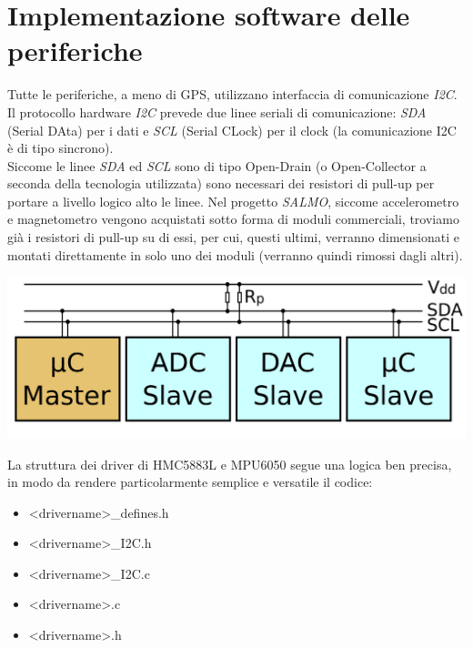 \hypertarget{implementazione-software-delle-periferiche}{%
\section{Implementazione software delle
periferiche}\label{implementazione-software-delle-periferiche}}

Tutte le periferiche, a meno di GPS, utilizzano interfaccia di
comunicazione \emph{I2C}.\\
Il protocollo hardware \emph{I2C} prevede due linee seriali di
comunicazione: \emph{SDA} (Serial DAta) per i dati e \emph{SCL} (Serial
CLock) per il clock (la comunicazione I2C è di tipo sincrono).\\
Siccome le linee \emph{SDA} ed \emph{SCL} sono di tipo Open-Drain (o
Open-Collector a seconda della tecnologia utilizzata) sono necessari dei
resistori di pull-up per portare a livello logico alto le linee. Nel
progetto \emph{SALMO}, siccome accelerometro e magnetometro vengono
acquistati sotto forma di moduli commerciali, troviamo già i resistori
di pull-up su di essi, per cui, questi ultimi, verranno dimensionati e
montati direttamente in solo uno dei moduli (verranno quindi rimossi
dagli altri).

\begin{center}
\includegraphics[scale=0.2]{figures/image61.png}
\captionsetup{type=figure}
\end{center}

\noindent La struttura dei driver di HMC5883L e MPU6050 segue una logica ben
precisa, in modo da rendere particolarmente semplice e versatile il
codice:

\begin{itemize}
\item
  
  \textless drivername\textgreater\_defines.h
  
\item
  
  \textless drivername\textgreater\_I2C.h
  
\item
  
  \textless drivername\textgreater\_I2C.c
  
\item
  
  \textless drivername\textgreater.c
  
\item
  
  \textless drivername\textgreater.h
  
\end{itemize}

